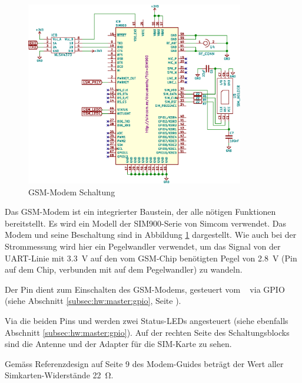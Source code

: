 \begin{figure}[h!t]
    \centering
    \includegraphics[width=0.85\textwidth]{images/superv-sch/supervisor--sch--gsm.eps}
    \caption[\Master: Schema GSM-Modem]{GSM-Modem Schaltung}
    \label{fig:sch:master:gsm}
\end{figure}

Das   GSM-Modem   ist   ein   integrierter  Baustein,   der   alle   n\"otigen
Funktionen  bereitstellt. Es  wird  ein  Modell der  SIM900-Serie  von  Simcom
\cite{datasheet:modem}  verwendet.  Das  Modem und  seine Beschaltung  sind in
Abbildung \ref{fig:sch:master:gsm} dargestellt. Wie  auch bei der Strommessung
wird  hier  ein   Pegelwandler  verwendet,  um   das  Signal   von  der
UART-Linie mit  \SI{3.3}{\volt} auf  den vom  GSM-Chip ben\"otigten  Pegel von
\SI{2.8}{\volt} (Pin  auf dem Chip, verbunden mit 
auf dem Pegelwandler) zu wandeln.

Der  Pin   dient  zum  Einschalten  des GSM-Modems,  gesteuert
vom  \Raspi~ via  GPIO  (siehe  Abschnitt  \ref{subsec:hw:master:gpio},  Seite
\pageref{subsec:hw:master:gpio}).

Via die beiden Pins   und  werden zwei Status-LEDs
angesteuert (siehe  ebenfalls Abschnitt  \ref{subsec:hw:master:gpio}). Auf der
rechten Seite des Schaltungsblocks sind die  Antenne und der Adapter f\"ur die
SIM-Karte zu sehen.

Gem\"ass  Referenzdesign  auf  Seite 9  des  Modem-Guides  \cite{ref:sim900:1}
betr\"agt der Wert aller Simkarten-Widerst\"ande \SI{22}{\ohm}.

